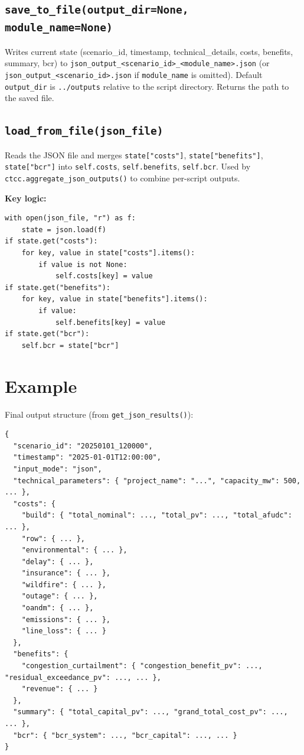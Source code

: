 \documentclass[ctcc_full_documentation.tex]{subfiles}
\begin{document}
\subsection{\texttt{save\_to\_file(output\_dir=None, module\_name=None)}}

Writes current state (scenario\_id, timestamp, technical\_details, costs, benefits, summary, bcr) to \texttt{json\_output\_<scenario\_id>\_<module\_name>.json} (or \texttt{json\_output\_<scenario\_id>.json} if \texttt{module\_name} is omitted). Default \texttt{output\_dir} is \texttt{../outputs} relative to the script directory. Returns the path to the saved file.

\subsection{\texttt{load\_from\_file(json\_file)}}

Reads the JSON file and merges \texttt{state["costs"]}, \texttt{state["benefits"]}, \texttt{state["bcr"]} into \texttt{self.costs}, \texttt{self.benefits}, \texttt{self.bcr}. Used by \texttt{ctcc.aggregate\_json\_outputs()} to combine per-script outputs.

\textbf{Key logic:}
\begin{lstlisting}
with open(json_file, "r") as f:
    state = json.load(f)
if state.get("costs"):
    for key, value in state["costs"].items():
        if value is not None:
            self.costs[key] = value
if state.get("benefits"):
    for key, value in state["benefits"].items():
        if value:
            self.benefits[key] = value
if state.get("bcr"):
    self.bcr = state["bcr"]
\end{lstlisting}

\section{Example}

Final output structure (from \texttt{get\_json\_results()}):
\begin{lstlisting}
{
  "scenario_id": "20250101_120000",
  "timestamp": "2025-01-01T12:00:00",
  "input_mode": "json",
  "technical_parameters": { "project_name": "...", "capacity_mw": 500, ... },
  "costs": {
    "build": { "total_nominal": ..., "total_pv": ..., "total_afudc": ... },
    "row": { ... },
    "environmental": { ... },
    "delay": { ... },
    "insurance": { ... },
    "wildfire": { ... },
    "outage": { ... },
    "oandm": { ... },
    "emissions": { ... },
    "line_loss": { ... }
  },
  "benefits": {
    "congestion_curtailment": { "congestion_benefit_pv": ..., "residual_exceedance_pv": ..., ... },
    "revenue": { ... }
  },
  "summary": { "total_capital_pv": ..., "grand_total_cost_pv": ..., ... },
  "bcr": { "bcr_system": ..., "bcr_capital": ..., ... }
}
\end{lstlisting}
\end{document}
